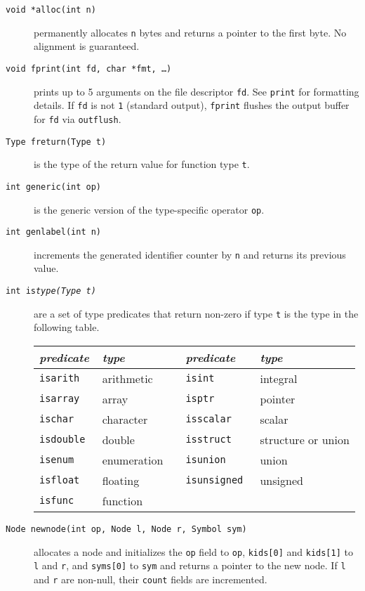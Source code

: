 \begin{description}

\item[{\tt void *alloc(int n)}] permanently allocates \verb|n| bytes and returns
a pointer to the first byte.  No alignment is guaranteed.

\item[{\tt void fprint(int fd, char *fmt, \ldots)}] prints up to 5 arguments on
the file descriptor \verb|fd|. See \verb|print| for formatting details.
If \verb|fd| is not \verb|1| (standard output),
\verb|fprint| flushes the output buffer for \verb|fd| via \verb|outflush|.

\item[{\tt Type freturn(Type t)}] is the type of the return value for
function type \verb|t|.

\item[{\tt int generic(int op)}] is the generic version
of the type-specific operator \verb|op|.

\item[{\tt int genlabel(int n)}] increments the generated identifier
counter by \verb|n| and returns its previous value.

\item[{\tt int is\it type\/\tt(Type t)}] are a set of type predicates that
return non-zero if type \verb|t| is the type in the following table.

\begin{center}
\begin{tabular}{lllll}
\it predicate	& \it type	&& \it predicate	& \it type \\ \hline
\tt isarith	& arithmetic	&& \tt isint		& integral \\
\tt isarray	& array		&& \tt isptr		& pointer \\
\tt ischar	& character	&& \tt isscalar		& scalar \\
\tt isdouble	& double	&& \tt isstruct		& structure or union \\
\tt isenum	& enumeration	&& \tt isunion		& union \\
\tt isfloat	& floating	&& \tt isunsigned	& unsigned \\
\tt isfunc	& function	&& \\
\end{tabular}
\end{center}

\item[{\tt Node newnode(int op, Node l, Node r, Symbol sym)}] allocates a node
and initializes the \verb|op| field to \verb|op|, \verb|kids[0]| and \verb|kids[1]|
to \verb|l| and \verb|r|, and \verb|syms[0]| to \verb|sym| and returns
a pointer to the new node. If \verb|l| and \verb|r| are non-null,
their \verb|count| fields are incremented.


\end{description}
